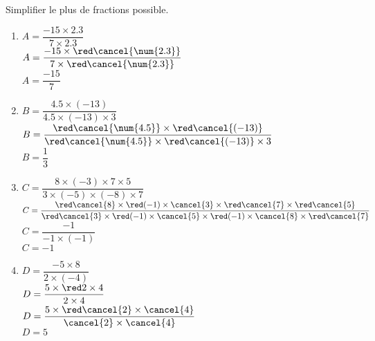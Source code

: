 \begin{corrige}
    Simplifier le plus de fractions possible.
    \begin{multicols}{2}
        \begin{spacing}{2}
            \begin{enumerate}
                \item $A=\dfrac{-15\times\num{2.3}}{7\times\num{2.3}}$\\
                $A=\dfrac{-15\times{\red\cancel{\num{2.3}}}}{7\times{\red\cancel{\num{2.3}}}}$\\
                {\red $A=\dfrac{-15}{7}$}
                \item $B=\dfrac{\num{4.5}\times (-13)}{\num{4.5}\times (-13)\times 3}$\\
                $B=\dfrac{{\red\cancel{\num{4.5}}}\times {\red\cancel{(-13)}}}{{\red\cancel{\num{4.5}}}\times {\red\cancel{(-13)}}\times 3}$\\
                {\red $B=\dfrac{1}{3}$}
                \columnbreak
                \item {\footnotesize $C=\dfrac{8\times (-3)\times 7\times 5}{3\times (-5)\times (-8)\times 7}$}\\
                {\scriptsize $C=\dfrac{{\red\cancel{8}}\times {\red (-1)\times \cancel{3}}\times {\red\cancel{7}}\times {\red\cancel{5}}}{{\red\cancel{3}}\times {\red (-1)\times \cancel{5}}\times {\red (-1)\times \cancel{8}}\times {\red\cancel{7}}}$}\\
                {\red $C=\dfrac{-1}{-1\times (-1)}$\\
                $C=-1$
                }
                \item $D=\dfrac{-5\times 8}{2\times (-4)}$\\
                $D=\dfrac{5\times {\red 2\times 4}}{2\times 4}$\\
                $D=\dfrac{5\times {\red \cancel{2}\times \cancel{4}}}{\cancel{2}\times \cancel{4}}$\\
                {\red $D=5$}
            \end{enumerate}
        \end{spacing}       
    \end{multicols}
\end{corrige}

